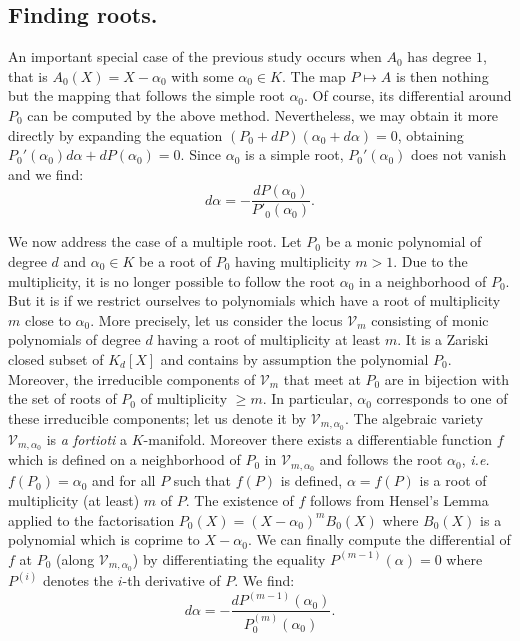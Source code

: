 \documentclass{sig-alternate}
\begin{document}
{\subsection*{Finding roots.}

An important special case of the previous study occurs when $A_0$ has 
degree $1$, that is $A_0(X) = X - \alpha_0$ with some $\alpha_0 \in K$. 
The map $P \mapsto A$ is then nothing but the mapping that 
follows the simple root $\alpha_0$. Of course, its differential around 
$P_0$ can be computed by the above method. Nevertheless, we may
obtain it more directly by expanding the equation $(P_0 + 
dP)(\alpha_0 + d\alpha) = 0$, obtaining
$P_0'(\alpha_0) d\alpha + dP(\alpha_0) = 0$.
Since $\alpha_0$ is a simple root, $P_0'(\alpha_0)$ 
does not vanish and we find:
$$d \alpha = - \frac{dP(\alpha_0)}{P'_0(\alpha_0)}.$$

We now address the case of a multiple root. Let $P_0$ be a monic 
polynomial of degree $d$ and $\alpha_0 \in K$ be a root of $P_0$ having 
multiplicity $m > 1$. Due to the multiplicity, it is no longer possible 
to follow the root $\alpha_0$ in a neighborhood of $P_0$. But it is if we 
restrict ourselves to polynomials which have a root of multiplicity $m$ 
close to $\alpha_0$. More precisely, let us consider the locus $\mathcal 
V_m$ consisting of monic polynomials of degree $d$ having a root of 
multiplicity at least $m$. It is a Zariski closed subset of $K_d[X]$ and
contains by assumption the polynomial $P_0$. 
Moreover, the irreducible components of $\mathcal V_m$ that meet at 
$P_0$ are in bijection with the set of roots of $P_0$ of multiplicity 
$\geq m$. In particular, $\alpha_0$ corresponds to one of these 
irreducible components; let us denote it by $\mathcal V_{m,\alpha_0}$. 
The algebraic variety $\mathcal V_{m,\alpha_0}$ is \emph{a fortioti} a
$K$-manifold. Moreover there exists a differentiable function $f$ which 
is defined on a neighborhood of $P_0$ in $\mathcal V_{m,\alpha_0}$ and 
follows the root $\alpha_0$, \emph{i.e.} $f(P_0) = \alpha_0$ and for all 
$P$ such that $f(P)$ is defined, $\alpha = f(P)$ is a root of 
multiplicity (at least) $m$ of $P$. The existence of $f$ follows from 
Hensel's Lemma applied to the factorisation $P_0(X) = (X-\alpha_0)^m 
B_0(X)$ where $B_0(X)$ is a polynomial which is coprime to $X - 
\alpha_0$. We can finally compute the differential of $f$ at $P_0$ 
(along $\mathcal V_{m,\alpha_0}$) by differentiating the equality
$P^{(m-1)}(\alpha) = 0$ where $P^{(i)}$ denotes the $i$-th derivative
of $P$. We find:
\begin{equation}
\label{eq:dalphamult}
d \alpha = - \frac{dP^{(m-1)}(\alpha_0)}{P_0^{(m)}(\alpha_0)}.
\end{equation}

}
\end{document}
